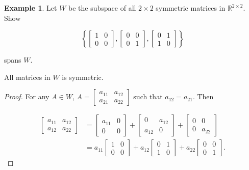 \documentclass[12pt]{article}
\theoremstyle{definition}
\newtheorem*{example}{Example}
\begin{document}
\begin{example}
\item Let $W$ be the subspace of all $2 \times 2$ symmetric matrices in $\mathbb{R}^{2 \times 2}$. Show

\[
\left\{
\begin{bmatrix}
1 & 0 \\
0 & 0
\end{bmatrix},
\begin{bmatrix}
0 & 0 \\
0 & 1
\end{bmatrix},
\begin{bmatrix}
0 & 1 \\
1 & 0 
\end{bmatrix}
\right\}
\]

spans $W$.

All matrices in $W$ is symmetric.

\begin{proof}
For any $A \in W$, $A = \begin{bmatrix} a_{11} & a_{12} \\ a_{21} & a_{22} \end{bmatrix}$
such that $a_{12} = a_{21}$. Then

\begin{align*}
\begin{bmatrix}
a_{11} & a_{12} \\
a_{12} & a_{22}
\end{bmatrix}
&=
\begin{bmatrix}
a_{11} & 0 \\
0 & 0
\end{bmatrix}
+
\begin{bmatrix}
0 & a_{12} \\
a_{12} & 0
\end{bmatrix}
+
\begin{bmatrix}
0 & 0 \\
0 & a_{22}
\end{bmatrix} \\
&=
a_{11}
\begin{bmatrix}
1 & 0 \\
0 & 0
\end{bmatrix}
+
a_{12}
\begin{bmatrix}
0 & 1 \\
1 & 0 
\end{bmatrix}
+
a_{22}
\begin{bmatrix}
0 & 0 \\
0 & 1
\end{bmatrix}.
\end{align*}


\end{proof}
\end{example}
\end{document}
